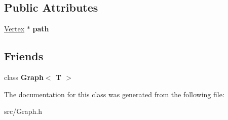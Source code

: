 \subsection*{Public Attributes}
\begin{DoxyCompactItemize}
\item 
\hypertarget{class_vertex_abd40febd917aa25add6bd42237c8463a}{}\label{class_vertex_abd40febd917aa25add6bd42237c8463a} 
\hyperlink{class_vertex}{Vertex} $\ast$ {\bfseries path}
\end{DoxyCompactItemize}
\subsection*{Friends}
\begin{DoxyCompactItemize}
\item 
\hypertarget{class_vertex_aefa9b76cd57411c5354e5620dc2d84dd}{}\label{class_vertex_aefa9b76cd57411c5354e5620dc2d84dd} 
class {\bfseries Graph$<$ T $>$}
\end{DoxyCompactItemize}


The documentation for this class was generated from the following file\+:\begin{DoxyCompactItemize}
\item 
src/Graph.\+h\end{DoxyCompactItemize}
